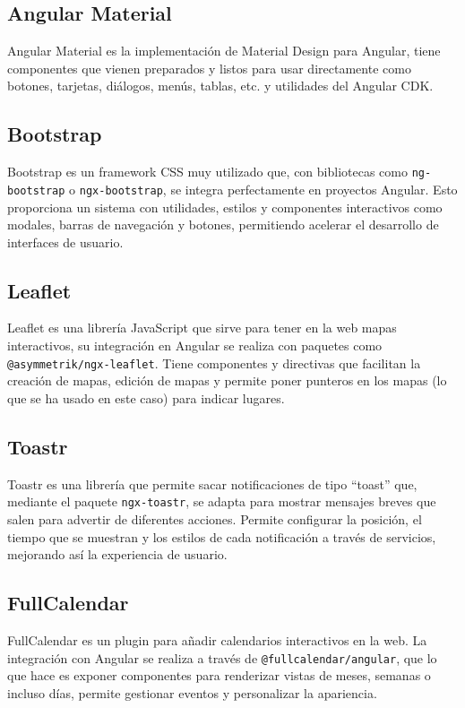 \subsection{Angular Material}
Angular Material es la implementación de Material Design para Angular, tiene componentes que vienen preparados y listos para usar directamente como botones, tarjetas, diálogos, menús, tablas, etc. y utilidades del Angular CDK.

\subsection{Bootstrap}
Bootstrap es un framework CSS muy utilizado que, con bibliotecas como \texttt{ng-bootstrap} o \texttt{ngx-bootstrap}, se integra perfectamente en proyectos Angular. Esto proporciona un sistema con utilidades, estilos y componentes interactivos como modales, barras de navegación y botones, permitiendo acelerar el desarrollo de interfaces de usuario.

\subsection{Leaflet}
Leaflet es una librería JavaScript que sirve para tener en la web mapas interactivos, su integración en Angular se realiza con paquetes como \texttt{@asymmetrik/ngx-leaflet}. Tiene componentes y directivas que facilitan la creación de mapas, edición de mapas y permite poner punteros en los mapas (lo que se ha usado en este caso) para indicar lugares.

\subsection{Toastr}
Toastr es una librería que permite sacar notificaciones de tipo “toast” que, mediante el paquete \texttt{ngx-toastr}, se adapta para mostrar mensajes breves que salen para advertir de diferentes acciones. Permite configurar la posición, el tiempo que se muestran y los estilos de cada notificación a través de servicios, mejorando así la experiencia de usuario.

\subsection{FullCalendar}
FullCalendar es un plugin para añadir calendarios interactivos en la web. La integración con Angular se realiza a través de \texttt{@fullcalendar/angular}, que lo que hace es exponer componentes para renderizar vistas de meses, semanas o incluso días, permite gestionar eventos y personalizar la apariencia.


